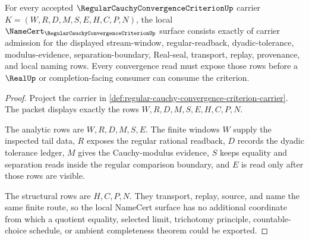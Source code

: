 \begin{theorem}
\label{thm:regular-cauchy-convergence-criterion-namecert-obligations}
For every accepted $\RegularCauchyConvergenceCriterionUp$ carrier $K=(W,R,D,M,S,E,H,C,P,N)$, the local $\NameCert_{\RegularCauchyConvergenceCriterionUp}$ surface consists exactly of carrier admission for the displayed stream-window, regular-readback, dyadic-tolerance, modulus-evidence, separation-boundary, Real-seal, transport, replay, provenance, and local naming rows. Every convergence read must expose those rows before a $\RealUp$ or completion-facing consumer can consume the criterion.
\end{theorem}
\begin{proof}
Project the carrier in \autoref{def:regular-cauchy-convergence-criterion-carrier}. The packet displays exactly the rows $W,R,D,M,S,E,H,C,P,N$.

The analytic rows are $W,R,D,M,S,E$. The finite windows $W$ supply the inspected tail data, $R$ exposes the regular rational readback, $D$ records the dyadic tolerance ledger, $M$ gives the Cauchy-modulus evidence, $S$ keeps equality and separation reads inside the regular comparison boundary, and $E$ is read only after those rows are visible.

The structural rows are $H,C,P,N$. They transport, replay, source, and name the same finite route, so the local NameCert surface has no additional coordinate from which a quotient equality, selected limit, trichotomy principle, countable-choice schedule, or ambient completeness theorem could be exported.
\end{proof}

